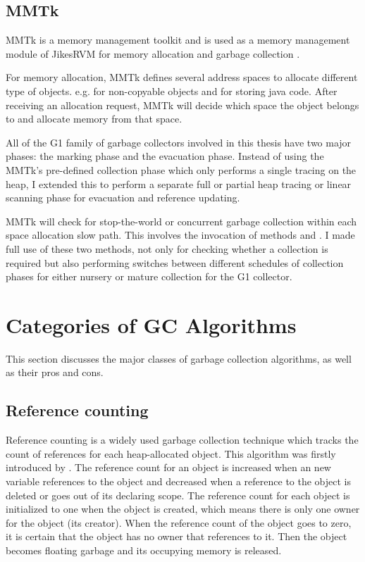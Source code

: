 \subsection{MMTk}

MMTk is a memory management toolkit and is used as a memory management module of JikesRVM for
memory allocation and garbage collection \citep{blackburn2004oil}.

For memory allocation, MMTk defines several address spaces to
allocate different type of objects. e.g.  for non-copyable objects
and  for storing java code. After receiving an allocation request,
MMTk will decide which space the object belongs to and allocate memory from that space.

All of the G1 family of garbage collectors involved in this thesis have two major phases:
the marking phase and the evacuation phase.
Instead of using the MMTk's pre-defined 
collection phase which only performs a single tracing on the heap, I extended this
to perform a separate full or partial heap tracing or linear scanning phase for
evacuation and reference updating.

MMTk will check for stop-the-world or concurrent garbage collection
within each space allocation slow path.
This involves the invocation of methods 
and .
I made full use of these two methods,
not only for checking whether a collection is required but also performing switches between different schedules of collection phases
for either nursery or mature collection for the G1 collector.

\section{Categories of GC Algorithms}
\label{sec:gcalgorithms}

This section discusses the major classes of garbage collection algorithms, as well
as their pros and cons.

\subsection{Reference counting}

Reference counting is a widely used garbage collection technique which tracks the
count of references for each heap-allocated object. This algorithm was firstly
introduced by \cite{collins1960method}.
The reference count for an object is increased when an new variable references to
the object and decreased when a reference
to the object is deleted or goes out of its declaring scope. The reference count for
each object is initialized to one when the object is created, which means there is only one
owner for the object (its creator). When the reference count of the object goes
to zero, it is certain that the object has no owner that references to it. Then the
object becomes floating garbage and its occupying memory is released.

